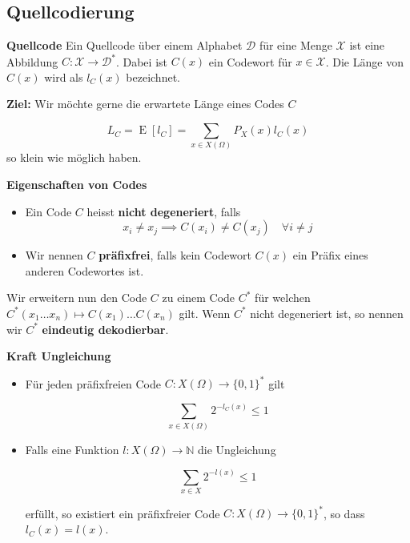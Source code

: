 \documentclass[25pt]{sciposter}
\newcommand{\N}{\mathbb{N}}
\newcommand{\E}{\operatorname{E}}
\newenvironment{defn}[1]{\begin{mdframed}[backgroundcolor=blue!10,innertopmargin=15pt, nobreak=true,innerbottommargin=15pt]
		\textbf{#1 }
	}
	{ 
	\end{mdframed}
}
\newenvironment{thm}[1]{\begin{mdframed}[nobreak=true,backgroundcolor=Emerald!10,innertopmargin=15pt, innerbottommargin=15pt]
		\textbf{#1 }
	}
	{ 
	\end{mdframed}
}
\begin{document}
\begin{multicols}{3}
\section{Quellcodierung}


\begin{defn}{Quellcode} Ein Quellcode über einem Alphabet $\mathcal{D}$ für eine Menge $\mathcal{X}$ ist eine Abbildung $C:\mathcal{X} \to \mathcal{D}^*$. Dabei ist $C(x)$ ein Codewort für $x\in \mathcal{X}$. Die Länge von $C(x)$ wird als $l_C(x)$ bezeichnet.
\end{defn}

\textbf{Ziel:} Wir möchte gerne die erwartete Länge eines Codes $C$

\begin{equation*}
L_C = \E[l_C] = \sum_{x\in X(\Omega)} P_X(x) l_C(x)
\end{equation*}
so klein wie möglich haben.




\begin{defn}{Eigenschaften von Codes}
	\begin{itemize}
		\item Ein Code $C$ heisst \textbf{nicht degeneriert}, falls $$x_i \neq x_j \implies C(x_i) \neq C(x_j) \quad \forall i\neq j$$
		\item Wir nennen $C$ \textbf{präfixfrei}, falls kein Codewort $C(x)$ ein Präfix eines anderen Codewortes ist.
	\end{itemize}
\end{defn}

Wir erweitern nun den Code $C$ zu einem Code $C^*$ für welchen $C^*(x_1 \ldots x_n) \mapsto C(x_1)\ldots C(x_n)$ gilt. Wenn $C^*$ nicht degeneriert ist, so nennen wir $C^*$ \textbf{eindeutig dekodierbar}.

\begin{thm}{Kraft Ungleichung}
\begin{itemize}
	\item Für jeden präfixfreien Code $C:{X}(\Omega)\to \{0,1\}^*$ gilt 
	
	$$\sum_{x \in X(\Omega)} 2^{-l_C(x)} \leq 1$$
	
	\item Falls eine Funktion $l:X(\Omega)\to\N$ die Ungleichung
	
	$$\sum_{x\in X} 2^{-l(x)} \leq 1$$
	
	erfüllt, so existiert ein präfixfreier Code $C:X(\Omega) \to \{0,1\}^*$, so dass $l_C(x) = l(x)$.
\end{itemize}
\end{thm}


\end{multicols}
\end{document}
